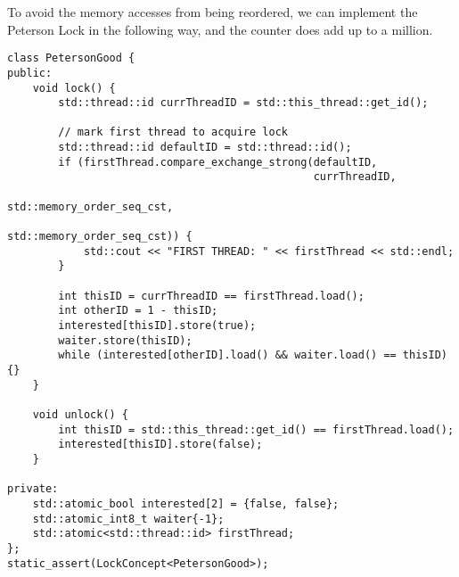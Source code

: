 \begin{solution}
To avoid the memory accesses from being reordered, we can implement the Peterson Lock in the following way, and the counter does add up to a million.

\begin{verbatim}
class PetersonGood {
public:
    void lock() {
        std::thread::id currThreadID = std::this_thread::get_id();

        // mark first thread to acquire lock
        std::thread::id defaultID = std::thread::id();
        if (firstThread.compare_exchange_strong(defaultID,
                                                currThreadID,
                                                std::memory_order_seq_cst,
                                                std::memory_order_seq_cst)) {
            std::cout << "FIRST THREAD: " << firstThread << std::endl;
        }

        int thisID = currThreadID == firstThread.load();
        int otherID = 1 - thisID;
        interested[thisID].store(true);
        waiter.store(thisID);
        while (interested[otherID].load() && waiter.load() == thisID) {}
    }

    void unlock() {
        int thisID = std::this_thread::get_id() == firstThread.load();
        interested[thisID].store(false);
    }

private:
    std::atomic_bool interested[2] = {false, false};
    std::atomic_int8_t waiter{-1};
    std::atomic<std::thread::id> firstThread;
};
static_assert(LockConcept<PetersonGood>);
\end{verbatim}
\end{solution}
